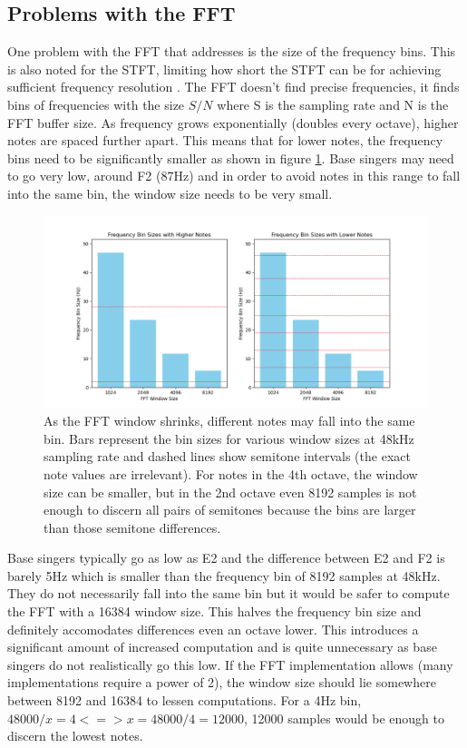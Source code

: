 \subsection{Problems with the FFT}
One problem with the FFT that   addresses is the size of the frequency bins. This is also noted for the STFT, limiting how short the STFT can be for achieving sufficient frequency resolution . The FFT doesn't find precise frequencies, it finds bins of frequencies with the size $S/N$ where S is the sampling rate and N is the FFT buffer size. As frequency grows exponentially (doubles every octave), higher notes are spaced further apart. This means that for lower notes, the frequency bins need to be significantly smaller as shown in figure \ref{fig:fftBinSizeChart}. Base singers may need to go very low, around F2 (87Hz) and in order to avoid notes in this range to fall into the same bin, the window size needs to be very small.  

\begin{figure}[ht]
    \centering
    \includegraphics[width=\textwidth]{./images/fft_bin_size_chart.png}
    \caption{As the FFT window shrinks, different notes may fall into the same bin. Bars represent the bin sizes for various window sizes at 48kHz sampling rate and dashed lines show semitone intervals (the exact note values are irrelevant). For notes in the 4th octave, the window size can be smaller, but in the 2nd octave even 8192 samples is not enough to discern all pairs of semitones because the bins are larger than those semitone differences.\label{fig:fftBinSizeChart}}
\end{figure}

Base singers typically go as low as E2 and the difference between E2 and F2 is barely 5Hz which is smaller than the frequency bin of 8192 samples at 48kHz. They do not necessarily fall into the same bin but it would be safer to compute the FFT with a 16384 window size. This halves the frequency bin size and definitely accomodates differences even an octave lower. This introduces a significant amount of increased computation and is quite unnecessary as base singers do not realistically go this low. If the FFT implementation allows (many implementations require a power of 2), the window size should lie somewhere between 8192 and 16384 to lessen computations. For a 4Hz bin, $48000/x = 4 <=> x = 48000/4 = 12000$, 12000 samples would be enough to discern the lowest notes. 

